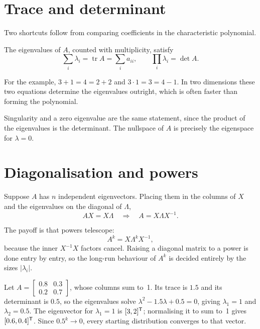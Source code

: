 \section{Trace and determinant}

Two shortcuts follow from comparing coefficients in the characteristic
polynomial.

\begin{proposition}
The eigenvalues of \(A\), counted with multiplicity, satisfy
\[
	\sum_{i}\lambda_i=\operatorname{tr}A=\sum_i a_{ii},
	\qquad
	\prod_i\lambda_i=\det A .
\]
\end{proposition}

For the example, \(3+1=4=2+2\) and \(3\cdot1=3=4-1\). In two dimensions these two
equations determine the eigenvalues outright, which is often faster than forming
the polynomial.

\begin{remark}
Singularity and a zero eigenvalue are the same statement, since the product of
the eigenvalues is the determinant. The nullspace of \(A\) is precisely the
eigenspace for \(\lambda=0\).
\end{remark}

\section{Diagonalisation and powers}

Suppose \(A\) has \(n\) independent eigenvectors. Placing them in the columns of
\(X\) and the eigenvalues on the diagonal of \(\Lambda\),
\[
	AX=X\Lambda
	\quad\Longrightarrow\quad
	A=X\Lambda X^{-1}.
\]

The payoff is that powers telescope:
\[
	A^{k}=X\Lambda^{k}X^{-1},
\]
because the inner \(X^{-1}X\) factors cancel. Raising a diagonal matrix to a
power is done entry by entry, so the long-run behaviour of \(A^{k}\) is decided
entirely by the sizes \(|\lambda_i|\).

\begin{example}
Let \(A=\begin{bmatrix}0.8&0.3\\0.2&0.7\end{bmatrix}\), whose columns sum to~1.
Its trace is \(1.5\) and its determinant is \(0.5\), so the eigenvalues solve
\(\lambda^{2}-1.5\lambda+0.5=0\), giving \(\lambda_1=1\) and \(\lambda_2=0.5\).
The eigenvector for \(\lambda_1=1\) is \([3,2]^{\mathsf{T}}\); normalising it to sum to~1
gives \([0.6,0.4]^{\mathsf{T}}\). Since \(0.5^{k}\to0\), every starting distribution
converges to that vector.
\end{example}

